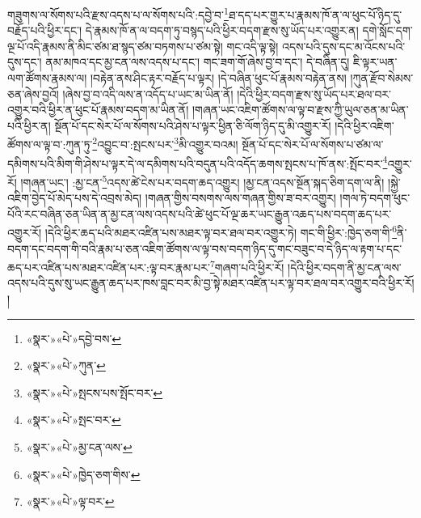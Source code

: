 གཟུགས་ལ་སོགས་པའི་རྫས་འདས་པ་ལ་སོགས་པའི་:དབྱེ་བ་\footnote{«སྣར་»«པེ་»དབྱེ་བས་}ཐ་དད་པར་གྱུར་པ་རྣམས་ཁོ་ན་ལ་ཕུང་པོ་ཉིད་དུ་བརྗོད་པའི་ཕྱིར་དང་། དེ་རྣམས་ཁོ་ན་ལ་བདག་ཏུ་བསྙད་པའི་ཕྱིར་བདག་རྫས་སུ་ཡོད་པར་འགྱུར་ན། དགེ་སློང་དག་ལྔ་པོ་འདི་རྣམས་ནི་མིང་ཙམ་ཐ་སྙད་ཙམ་བཏགས་པ་ཙམ་སྟེ། གང་འདི་ལྟ་སྟེ། འདས་པའི་དུས་དང་མ་འོངས་པའི་དུས་དང་། ནམ་མཁའ་དང་མྱ་ངན་ལས་འདས་པ་དང་། གང་ཟག་གོ་ཞེས་བྱ་བ་དང་། དེ་བཞིན་དུ། ཇི་ལྟར་ཡན་ལག་ཚོགས་རྣམས་ལ། །བརྟེན་ནས་ཤིང་རྟར་བརྗོད་པ་ལྟར། །དེ་བཞིན་ཕུང་པོ་རྣམས་བརྟེན་ནས། །ཀུན་རྫོབ་སེམས་ཅན་ཞེས་བྱའོ། །ཞེས་བྱ་བ་འདི་ལས་ན་འདོད་པ་ཡང་མ་ཡིན་ནོ། །དེའི་ཕྱིར་བདག་རྫས་སུ་ཡོད་པར་ཐལ་བར་འགྱུར་བའི་ཕྱིར་ན་ཕུང་པོ་རྣམས་བདག་མ་ཡིན་ནོ། །གཞན་ཡང་འཇིག་ཚོགས་ལ་ལྟ་བ་རྫས་ཀྱི་ཡུལ་ཅན་མ་ཡིན་པའི་ཕྱིར་ན། སྔོན་པོ་དང་སེར་པོ་ལ་སོགས་པའི་ཤེས་པ་ལྟར་ཕྱིན་ཅི་ལོག་ཉིད་དུ་མི་འགྱུར་རོ། །དེའི་ཕྱིར་འཇིག་ཚོགས་ལ་ལྟ་བ་:ཀུན་ཏུ་\footnote{«སྣར་»«པེ་»ཀུན་}འབྱུང་བ་:སྤངས་པར་\footnote{«སྣར་»«པེ་»སྤངས་པས་སྤོང་བར་}མི་འགྱུར་བའམ། སྔོན་པོ་དང་སེར་པོ་ལ་སོགས་པ་ཙམ་ལ་དམིགས་པའི་མིག་གི་ཤེས་པ་ལྟར་དེ་ལ་དམིགས་པའི་བདུན་པའི་འདོད་ཆགས་སྤངས་པ་ཁོ་ནས་:སྤོང་བར་\footnote{«སྣར་»«པེ་»སྤང་བར་}འགྱུར་རོ། །གཞན་ཡང་། :མྱ་ངན་\footnote{«སྣར་»«པེ་»མྱ་ངན་ལས་}འདས་ཚེ་ངེས་པར་བདག་ཆད་འགྱུར། །མྱ་ངན་འདས་སྔོན་སྐད་ཅིག་དག་ལ་ནི། །སྐྱེ་འཇིག་བྱེད་པོ་མེད་པས་དེ་འབྲས་མེད། །གཞན་གྱིས་བསགས་ལས་གཞན་གྱིས་ཟ་བར་འགྱུར། །གལ་ཏེ་བདག་ཕུང་པོའི་རང་བཞིན་ཅན་ཡིན་ན་མྱ་ངན་ལས་འདས་པའི་ཚེ་ཕུང་པོ་ལྔ་ཆར་ཡང་རྒྱུན་འཆད་པས་བདག་ཆད་པར་འགྱུར་རོ། །དེའི་ཕྱིར་ཆད་པའི་མཐར་འཛིན་པས་མཐར་ལྟ་བར་ཐལ་བར་འགྱུར་ཏེ། གང་གི་ཕྱིར་:ཁྱེད་ཅག་གི་\footnote{«སྣར་»«པེ་»ཁྱེད་ཅག་གིས་}ནི་བདག་དང་བདག་གི་བའི་རྣམ་པ་ཅན་འཇིག་ཚོགས་ལ་ལྟ་བས་བདག་ཉིད་དུ་གང་བཟུང་བ་དེ་ཉིད་ལ་རྟག་པ་དང་ཆད་པར་འཛིན་པས་མཐར་འཛིན་པར་:ལྟ་བར་རྣམ་པར་\footnote{«སྣར་»«པེ་»ལྟ་བར་}གཞག་པའི་ཕྱིར་རོ། །དེའི་ཕྱིར་བདག་ནི་མྱ་ངན་ལས་འདས་པའི་དུས་སུ་ཡང་རྒྱུན་ཆད་པར་ཁས་བླང་བར་མི་བྱ་སྟེ་མཐར་འཛིན་པར་ལྟ་བར་ཐལ་བར་འགྱུར་བའི་ཕྱིར་རོ། །
